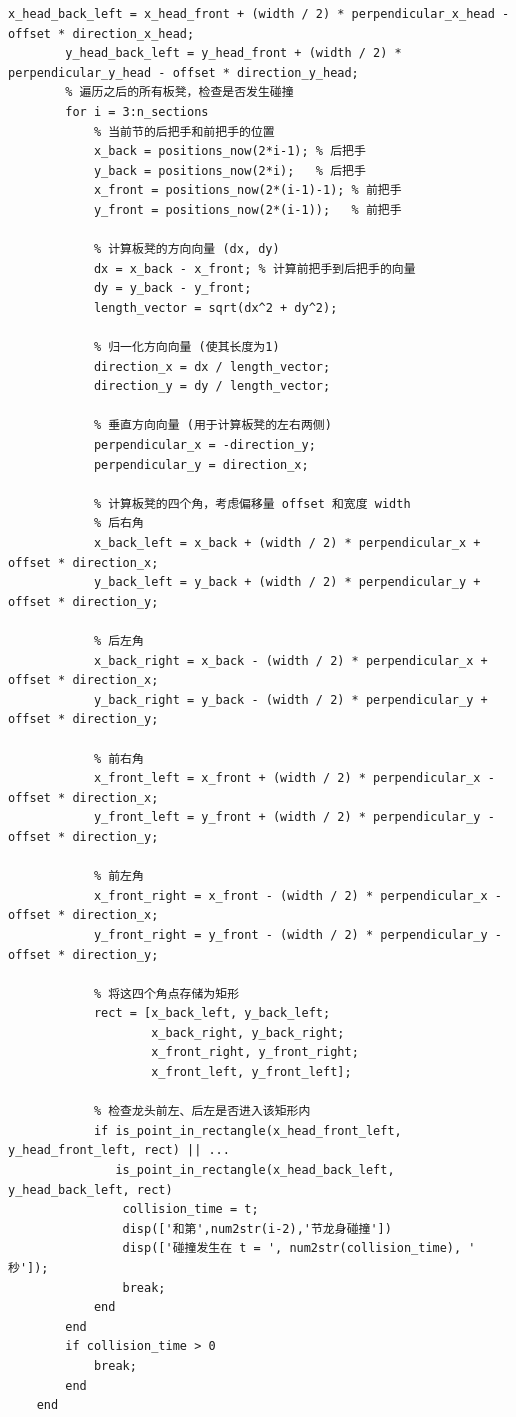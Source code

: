 \documentclass{cumcmthesis1}
\begin{document}
\begin{lstlisting}[caption={求解问题3的代码，将求解过程和结果打印到控制台}, label={lst:fourth_code}]
        x_head_back_left = x_head_front + (width / 2) * perpendicular_x_head - offset * direction_x_head;
        y_head_back_left = y_head_front + (width / 2) * perpendicular_y_head - offset * direction_y_head;
        % 遍历之后的所有板凳，检查是否发生碰撞
        for i = 3:n_sections
            % 当前节的后把手和前把手的位置
            x_back = positions_now(2*i-1); % 后把手
            y_back = positions_now(2*i);   % 后把手
            x_front = positions_now(2*(i-1)-1); % 前把手
            y_front = positions_now(2*(i-1));   % 前把手

            % 计算板凳的方向向量 (dx, dy)
            dx = x_back - x_front; % 计算前把手到后把手的向量
            dy = y_back - y_front;
            length_vector = sqrt(dx^2 + dy^2);

            % 归一化方向向量 (使其长度为1)
            direction_x = dx / length_vector;
            direction_y = dy / length_vector;

            % 垂直方向向量 (用于计算板凳的左右两侧)
            perpendicular_x = -direction_y;
            perpendicular_y = direction_x;

            % 计算板凳的四个角，考虑偏移量 offset 和宽度 width
            % 后右角
            x_back_left = x_back + (width / 2) * perpendicular_x + offset * direction_x;
            y_back_left = y_back + (width / 2) * perpendicular_y + offset * direction_y;

            % 后左角
            x_back_right = x_back - (width / 2) * perpendicular_x + offset * direction_x;
            y_back_right = y_back - (width / 2) * perpendicular_y + offset * direction_y;

            % 前右角
            x_front_left = x_front + (width / 2) * perpendicular_x - offset * direction_x;
            y_front_left = y_front + (width / 2) * perpendicular_y - offset * direction_y;

            % 前左角
            x_front_right = x_front - (width / 2) * perpendicular_x - offset * direction_x;
            y_front_right = y_front - (width / 2) * perpendicular_y - offset * direction_y;

            % 将这四个角点存储为矩形
            rect = [x_back_left, y_back_left;
                    x_back_right, y_back_right;
                    x_front_right, y_front_right;
                    x_front_left, y_front_left];

            % 检查龙头前左、后左是否进入该矩形内
            if is_point_in_rectangle(x_head_front_left, y_head_front_left, rect) || ...
               is_point_in_rectangle(x_head_back_left, y_head_back_left, rect)
                collision_time = t;
                disp(['和第',num2str(i-2),'节龙身碰撞'])
                disp(['碰撞发生在 t = ', num2str(collision_time), ' 秒']);
                break;
            end
        end
        if collision_time > 0
            break;
        end
    end
    

\end{lstlisting}
\end{document}
